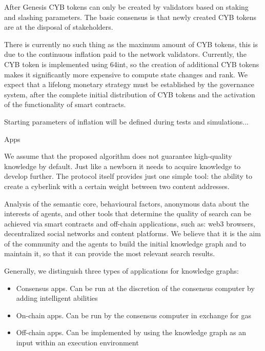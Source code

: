 \documentclass[8pt,oneside]{amsart}
\makeatletter
\renewcommand\subsection{\@startsection{subsection}
                                    {2}{\z@}
                                    {-3.25ex\@plus -1ex \@minus -.2ex}
                                    {0ex \@plus .2ex}
                                    {\play\Large}
                        }
\newcommand{\titleSection}[1]{\subsection{#1}}
\newenvironment{Figure}
  {\par\medskip\noindent\minipage{\linewidth}}
  {\endminipage\par\medskip}
\makeatother
\begin{document}
\begin{Figure}
 \centering
 
\end{Figure}

After Genesis CYB tokens can only be created by validators based on staking and slashing parameters. The basic consensus is that newly created CYB tokens are at the disposal of stakeholders.

There is currently no such thing as the maximum amount of CYB tokens, this is due to the continuous inflation paid to the
network validators. Currently, the CYB token is implemented using 64int, so the creation of additional CYB tokens makes it significantly more expensive to compute state changes and rank. We expect that a lifelong monetary strategy must be established by the governance system, after the complete initial distribution of CYB tokens and the activation of the functionality of smart contracts.

Starting parameters of inflation will be defined during tests and simulations...

\titleSection{Apps}\label{Apps}

We assume that the proposed algorithm does not guarantee high-quality knowledge by default. Just like a newborn it needs to acquire knowledge to develop further. The protocol itself provides just one simple tool: the ability to create a cyberlink with a certain weight between two content addresses.

Analysis of the semantic core, behavioural factors, anonymous data about the interests of agents, and other tools that determine the quality of search can be achieved via smart contracts and off-chain applications, such as: web3 browsers, decentralized social networks and content platforms. We believe that it is the aim of the community and the agents to build the initial knowledge graph and to maintain it, so that it can provide the most relevant search results.

Generally, we distinguish three types of applications for knowledge graphs:

\begin{itemize}
\item Consensus apps. Can be run at the discretion of the consensus computer by adding intelligent abilities
\item On-chain apps. Can be run by the consensus computer in exchange for gas
\item Off-chain apps. Can be implemented by using the knowledge graph as an input within an execution environment
\end{itemize}
\end{document}
